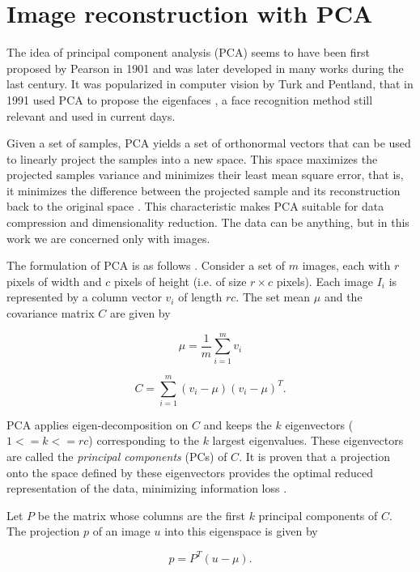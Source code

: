 \documentclass[10pt, conference, compsocconf]{IEEEtran}
\begin{document}
\section{Image reconstruction with PCA}

The idea of principal component analysis (PCA) seems to have been first proposed by Pearson in 1901 \cite{sirovich87} and was later developed in many works during the last century. It was popularized in computer vision by Turk and Pentland, that in 1991 used PCA to propose the eigenfaces \cite{turk91}, a face recognition method still relevant and used in current days.

Given a set of samples, PCA yields a set of orthonormal vectors that can be used to linearly project the samples into a new space. This space maximizes the projected samples variance and minimizes their least mean square error, that is, it minimizes the difference between the projected sample and its reconstruction back to the original space \cite{shlens09}. This characteristic makes PCA suitable for data compression and dimensionality reduction. The data can be anything, but in this work we are concerned only with images.

The formulation of PCA is as follows \cite{borja09}. Consider a set of $m$ images, each with $r$ pixels of width and $c$ pixels of height (i.e. of size $r \times c$ pixels). Each image $I_i$ is represented by a column vector $v_i$ of length $rc$. The set mean $\mu$ and the covariance matrix $C$ are given by

\begin{equation}
  \mu = \frac{1}{m} \sum_{i=1}^m{v_i}
\end{equation}

\begin{equation}
  C = \sum_{i=1}^m{(v_i - \mu)(v_i - \mu)^T}.
\end{equation}

PCA applies eigen-decomposition on $C$ and keeps the $k$ eigenvectors ($1 <= k <= rc$) corresponding to the $k$ largest eigenvalues. These eigenvectors are called the \emph{principal components} (PCs) of $C$. It is proven that a projection onto the space defined by these eigenvectors provides the optimal reduced representation of the data, minimizing information loss \cite{shlens09}.

Let $P$ be the matrix whose columns are the first $k$ principal components of $C$. The projection $p$ of an image $u$ into this eigenspace is given by

\begin{equation}
  p = P^T (u - \mu).
\end{equation}
\end{document}
